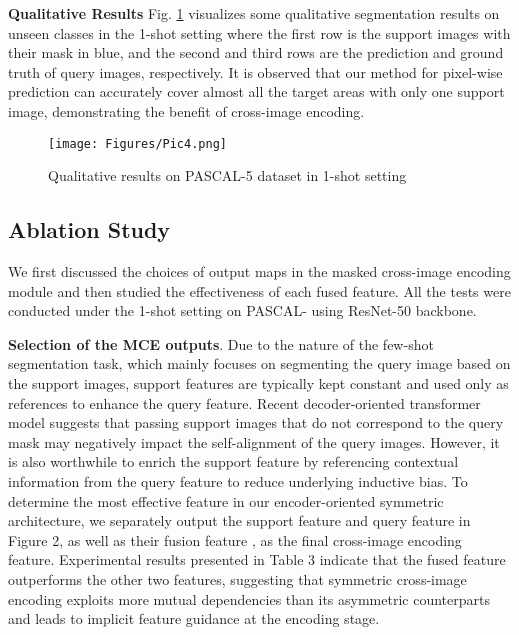 \documentclass[conference]{IEEEtran}
\begin{document}
 

\textbf{Qualitative Results} Fig. \ref{fig:fig4} visualizes some qualitative segmentation results on unseen classes in the 1-shot setting where the first row is the support images with their mask in blue, and the second and third rows are the prediction and ground truth of query images, respectively. It is observed that our method for pixel-wise prediction can accurately cover almost all the target areas with only one support image, demonstrating the benefit of cross-image encoding.

\begin{figure}[h]

               \centering
               \texttt{[image: Figures/Pic4.png]}


               \caption{Qualitative results on PASCAL-5 dataset in 1-shot setting}

               \label{fig:fig4}
\vspace{-1.0em}
\end{figure}

\subsection{Ablation Study}

We first discussed the choices of output maps in the masked cross-image encoding module and then studied the effectiveness of each fused feature. All the tests were conducted under the 1-shot setting on PASCAL- using ResNet-50 backbone.

\textbf{Selection of the MCE outputs}. Due to the nature of the few-shot segmentation task, which mainly focuses on segmenting the query image based on the support images, support features are typically kept constant and used only as references to enhance the query feature. Recent decoder-oriented transformer model\cite{CyCTR} suggests that passing support images that do not correspond to the query mask may negatively impact the self-alignment of the query images. However, it is also worthwhile to enrich the support feature by referencing contextual information from the query feature to reduce underlying inductive bias. To determine the most effective feature in our encoder-oriented symmetric architecture, we separately output the support feature  and query feature  in Figure 2, as well as their fusion feature , as the final cross-image encoding feature. Experimental results presented in Table 3 indicate that the fused feature outperforms the other two features, suggesting that symmetric cross-image encoding exploits more mutual dependencies than its asymmetric counterparts and leads to implicit feature guidance at the encoding stage.
\end{document}
